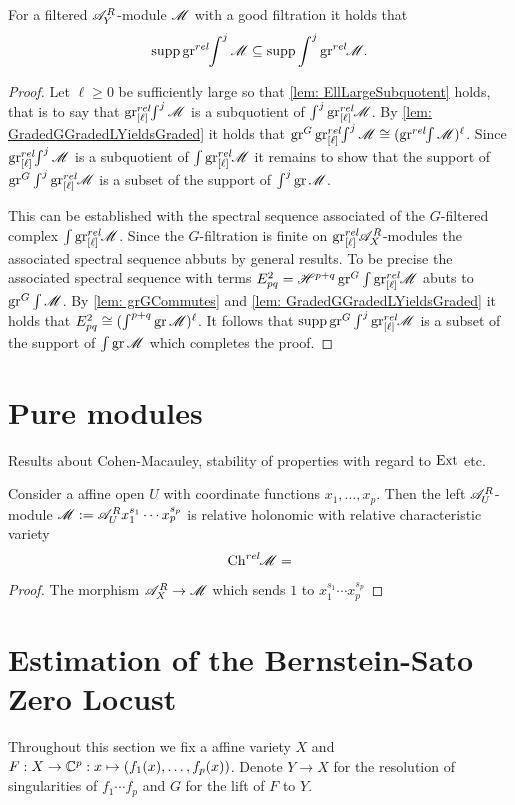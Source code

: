 \begin{proposition}\label{prop: SuppGrrelIntInclusion}
  For a filtered $\mathscr{A}_Y^R$-module $\mathscr{M}$ with a good filtration it holds that  $$\operatorname{supp} \operatorname{gr}^{rel}\mkern-5mu\int^j\mathscr{M} \subseteq \operatorname{supp} \int^j \operatorname{gr}^{rel}\mkern-5mu\mathscr{M}.$$
\end{proposition}
\begin{proof}
  Let $\ell\geq 0$ be sufficiently large so that \cref{lem: EllLargeSubquotent} holds, that is to say that $\operatorname{gr}_{[\ell]}^{rel}\mkern-5mu\int^j \mathscr{M}$ is a subquotient of $\int^j \operatorname{gr}_{[\ell]}^{rel}\mkern-5mu \mathscr{M}$.
  By \cref{lem: GradedGGradedLYieldsGraded} it holds that $\operatorname{gr}^G\operatorname{gr}_{[\ell]}^{rel}\mkern-5mu \int^j \mathscr{M} \cong (\operatorname{gr}^{rel}\mkern-5mu\int\mathscr{M})^\ell$.
  Since $\operatorname{gr}_{[\ell]}^{rel}\mkern-5mu \int^j \mathscr{M}$ is a subquotient of $\int \operatorname{gr}_{[\ell]}^{rel}\mkern-5mu\mathscr{M}$ it remains to show that the support of $\operatorname{gr}^G \int^j \operatorname{gr}_{[\ell]}^{rel}\mkern-5mu\mathscr{M}$ is a subset of the support of $\int^j \operatorname{gr} \mathscr{M}$.

  This can be established with the spectral sequence associated of the $G$-filtered complex $\int \operatorname{gr}_{[\ell]}^{rel}\mkern-5mu \mathscr{M}$. Since the $G$-filtration is finite on $\operatorname{gr}_{[\ell]}^{rel}\mkern-5mu\mathscr{A}_X^R$-modules the associated spectral sequence abbuts by general results. To be precise the associated spectral sequence with terms
  $E^2_{pq} = \mathscr{H}^{p+q}\operatorname{gr}^G \int \operatorname{gr}_{[\ell]}^{rel}\mkern-5mu \mathscr{M}$ abuts to $\operatorname{gr}^G\int \mathscr{M}$.
  By \cref{lem: grGCommutes} and \cref{lem: GradedGGradedLYieldsGraded} it holds that $E^2_{pq} \cong (\int^{p+q}\operatorname{gr} \mathscr{M})^\ell$. 
  It follows that $\operatorname{supp}\operatorname{gr}^G \int^j \operatorname{gr}_{[\ell]}^{rel}\mkern-5mu\mathscr{M}$ is a subset of the support of $\int \operatorname{gr} \mathscr{M}$ which completes the proof.
\end{proof}

\section{Pure modules}
Results about Cohen-Macauley, stability of properties with regard to $\operatorname{Ext}$ etc.

\begin{lemma}
    Consider a affine open $U$ with coordinate functions $x_1,\ldots,x_p$. Then the left $\mathscr{A}_U^R$-module $\mathscr{M} := \mathscr{A}_U^Rx_1^{s_1}\cdots x_p^{s_p}$ is relative holonomic with relative characteristic variety
    $$\operatorname{Ch}^{rel}\mkern-5mu\mathscr{M} =  $$
\end{lemma}
\begin{proof}
    The morphism $\mathscr{A}_X^R \to \mathscr{M}$ which sends $1$ to $x_1^{s_1}\cdots x_p^{s_p}$ 
\end{proof}
\section{Estimation of the Bernstein-Sato Zero Locust}
Throughout this section we fix a affine variety $X$ and $F:X\to \mathbb{C}^p: x \mapsto (f_1(x), \ldots, f_p(x))$. Denote $Y\to X$ for the resolution of singularities of $f_1\cdots f_p$ and $G$ for the lift of $F$ to $Y$.
